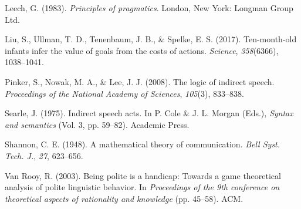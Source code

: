\documentclass[floatsintext,man]{apa6}
\theoremstyle{definition}
\theoremstyle{definition}
\theoremstyle{definition}
\theoremstyle{remark}
\begin{document}
\hypertarget{ref-leech1983}{}
Leech, G. (1983). \emph{Principles of pragmatics}. London, New York:
Longman Group Ltd.

\hypertarget{ref-liu2017ten}{}
Liu, S., Ullman, T. D., Tenenbaum, J. B., \& Spelke, E. S. (2017).
Ten-month-old infants infer the value of goals from the costs of
actions. \emph{Science}, \emph{358}(6366), 1038--1041.

\hypertarget{ref-pinker2008}{}
Pinker, S., Nowak, M. A., \& Lee, J. J. (2008). The logic of indirect
speech. \emph{Proceedings of the National Academy of Sciences},
\emph{105}(3), 833--838.

\hypertarget{ref-searle1975}{}
Searle, J. (1975). Indirect speech acts. In P. Cole \& J. L. Morgan
(Eds.), \emph{Syntax and semantics} (Vol. 3, pp. 59--82). Academic
Press.

\hypertarget{ref-shannon1948}{}
Shannon, C. E. (1948). A mathematical theory of communication.
\emph{Bell Syst. Tech. J.}, \emph{27}, 623--656.

\hypertarget{ref-vanRooy2003}{}
Van Rooy, R. (2003). Being polite is a handicap: Towards a game
theoretical analysis of polite linguistic behavior. In \emph{Proceedings
of the 9th conference on theoretical aspects of rationality and
knowledge} (pp. 45--58). ACM.
\end{document}
